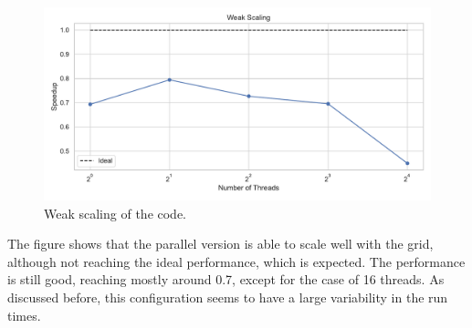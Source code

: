 \documentclass[unicode,11pt,a4paper,oneside,numbers=endperiod,openany]{scrartcl}
\begin{document}
\begin{figure}[!h]
    \centering
    \includegraphics[width=\textwidth]{../mini_app/weak_scaling_plot.pdf}
    \caption{Weak scaling of the code.}
    \label{im:weak_scaling}
\end{figure}
The figure shows that the parallel version is able to scale well with the grid,
although not reaching the ideal performance, which is expected. The performance
is still good, reaching mostly around 0.7, except for the case of 16 threads. As
discussed before, this configuration seems to have a large variability in the
run times.
\end{document}
